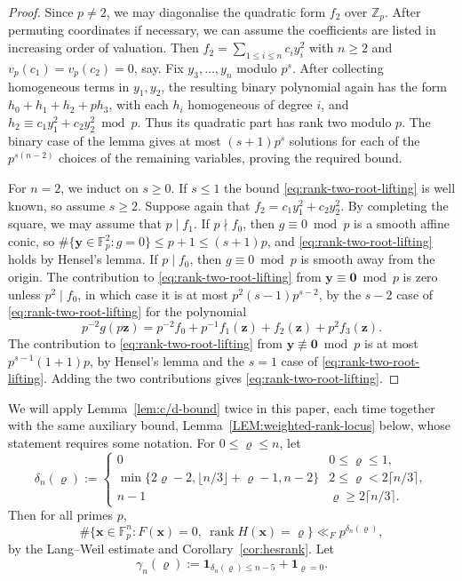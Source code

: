 \documentclass[a4paper,11pt, twoside,reqno]{amsart}
\theoremstyle{plain}
\theoremstyle{definition}
\theoremstyle{remark}
\newcommand{\bfx}{\bm{x}}
\newcommand{\bfy}{\bm{y}}
\newcommand{\bfz}{\bm{z}}
\newcommand{\ZZ}{\mathbb{Z}}
\DeclareMathOperator{\rank}{rank}
\renewcommand{\le}{\leqslant}
\renewcommand{\leq}{\leqslant}
\renewcommand{\ge}{\geqslant}
\renewcommand{\geq}{\geqslant}
\newcommand{\FF}{\mathbb{F}}
\numberwithin{equation}{section}
\begin{document}
\begin{proof}
Since $p\ne 2$, we may diagonalise the quadratic form $f_2$ over $\ZZ_p$.
After permuting coordinates if necessary, we can
assume the coefficients are listed in increasing order of valuation.
Then $f_2 = \sum_{1\le i\le n} c_iy_i^2$
with $n\ge 2$ and $v_p(c_1)=v_p(c_2)=0$, say.
Fix $y_3,\ldots,y_n$ modulo $p^s$. After collecting homogeneous
terms in $y_1,y_2$, the resulting binary polynomial again has
the form $h_0+h_1+h_2+ph_3$, with each $h_i$ homogeneous of
degree $i$, and
$h_2\equiv c_1y_1^2+c_2y_2^2\bmod p$.
Thus its quadratic part has rank two modulo $p$. The binary
case of the lemma gives at most $(s+1)p^s$ solutions for each
of the $p^{s(n-2)}$ choices of the remaining variables,
proving the required bound.


For $n=2$, we induct on $s\ge 0$.
If $s\le 1$ the bound \eqref{eq:rank-two-root-lifting} is well known, so assume $s\ge 2$.
Suppose again that $f_2 = c_1y_1^2+c_2y_2^2$.
By completing the square, we may assume that $p\mid f_1$.
If $p\nmid f_0$, then $g\equiv 0\bmod{p}$ is a smooth affine conic,
so $\#\{\bfy\in \FF_p^2: g=0\} \le p+1 \le (s+1)p$,
and \eqref{eq:rank-two-root-lifting} holds by Hensel's lemma.
If $p\mid f_0$, then $g\equiv 0\bmod{p}$ is smooth away from the origin.
The contribution to \eqref{eq:rank-two-root-lifting} from $\bfy\equiv \bm0\bmod{p}$
is zero unless $p^2\mid f_0$, in which case it
is at most $p^2 (s-1)p^{s-2}$, by the $s-2$ case of \eqref{eq:rank-two-root-lifting}
for the polynomial
$$p^{-2} g(p\bfz) = p^{-2}f_0 + p^{-1}f_1(\bfz) + f_2(\bfz) + p^2f_3(\bfz).$$
The contribution to \eqref{eq:rank-two-root-lifting} from $\bfy\not\equiv \bm0\bmod{p}$
is at most $p^{s-1} (1+1)p$, by Hensel's lemma and
the $s=1$ case of \eqref{eq:rank-two-root-lifting}.
Adding the two contributions gives \eqref{eq:rank-two-root-lifting}.
\end{proof}


We will apply Lemma~\ref{lem:c/d-bound} twice
in this paper,
each time together with the same auxiliary bound,
Lemma~\ref{LEM:weighted-rank-locus} below,
whose statement requires some notation.
For \(0\leq \varrho\leq n\), let
\begin{equation}
\delta_n(\varrho) :=
\begin{cases}
0&0\le \varrho\le 1,\\
\min\{2\varrho-2,\lfloor n/3\rfloor+\varrho-1,n-2\}&2\leq \varrho<2\lceil n/3\rceil,\\
n-1&\varrho\geq2\lceil n/3\rceil.
\end{cases}
\label{eq:q-delta}
\end{equation}
Then for all primes $p$,
\begin{equation}
\label{eq:q-first-rank}
\#\{\bfx\in\FF_p^n:F(\bfx)=0,\ \rank H(\bfx)=\varrho\}
\ll_F p^{\delta_n(\varrho)},
\end{equation}
by the Lang--Weil estimate
and Corollary~\ref{cor:hesrank}.
Let
\begin{equation}
\gamma_n(\varrho)
:= \bm{1}_{\delta_n(\varrho)\le n-5}
+ \bm{1}_{\varrho=0}.
\label{eq:q-gamma}
\end{equation}
\end{document}

